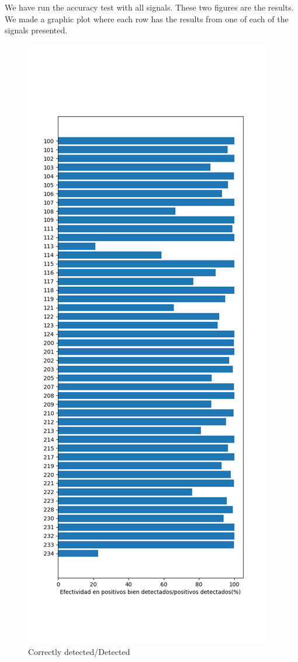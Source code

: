 \documentclass[conference]{IEEEtran}
\begin{document}
We have run the accuracy test with all signals.
These two figures are the results. We made a graphic plot where each row has the results from one of each of the signals presented.

\begin{figure}[H]
\centerline{\includegraphics[scale=0.3]{imagenes/EfectividadDetectados}}
\caption{Correctly detected/Detected}
\label{fig}
\end{figure}
\end{document}
